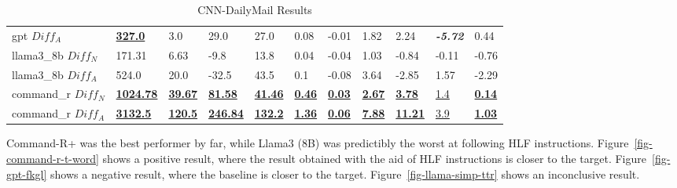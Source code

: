 \documentclass[runningheads,a4paper,11pt]{article}
\begin{document}
\begin{table}[!ht]
{\begin{tabular}{lllllllllll}
            gpt $Diff_A$        & \underline{\textbf{327.0}}   & 3.0                        & 29.0                        & 27.0                       & 0.08                      & -0.01                     & 1.82                      & 2.24                       & \textit{\textbf{-5.72}} & 0.44                      \\
            llama3\_8b $Diff_N$ & 171.31                       & 6.63                       & -9.8                        & 13.8                       & 0.04                      & -0.04                     & 1.03                      & -0.84                      & -0.11                   & -0.76                     \\
            llama3\_8b $Diff_A$ & 524.0                        & 20.0                       & -32.5                       & 43.5                       & 0.1                       & -0.08                     & 3.64                      & -2.85                      & 1.57                    & -2.29                     \\
            command\_r $Diff_N$ & \underline{\textbf{1024.78}} & \underline{\textbf{39.67}} & \underline{\textbf{81.58}}  & \underline{\textbf{41.46}} & \underline{\textbf{0.46}} & \underline{\textbf{0.03}} & \underline{\textbf{2.67}} & \underline{\textbf{3.78}}  & \underline{1.4}         & \underline{\textbf{0.14}} \\
            command\_r $Diff_A$ & \underline{\textbf{3132.5}}  & \underline{\textbf{120.5}} & \underline{\textbf{246.84}} & \underline{\textbf{132.2}} & \underline{\textbf{1.36}} & \underline{\textbf{0.06}} & \underline{\textbf{7.88}} & \underline{\textbf{11.21}} & \underline{3.9}         & \underline{\textbf{1.03}} \\
            \bottomrule
        \end{tabular}%
    }
    \caption{CNN-DailyMail Results}
    \label{table-cnn-dailymail-results}
\end{table}

Command-R+ was the best performer by far, while Llama3 (8B) was predictibly the
worst at following HLF instructions.
Figure~\ref{fig-command-r-t-word} shows a positive result, where the result
obtained with the aid of HLF instructions is closer to the target.
Figure~\ref{fig-gpt-fkgl} shows a negative result, where the baseline is closer
to the target.
Figure~\ref{fig-llama-simp-ttr} shows an inconclusive result.
\end{document}
